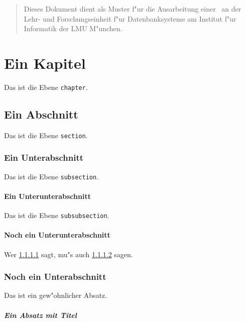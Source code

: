 \documentclass[pdftex,12pt,a4paper]{report}
\begin{document}
\deckblatt

\erklaerung

\begin{abstract}
Dieses Dokument dient als Muster f"ur die Ausarbeitung einer \the\arbeit\
an der Lehr- und Forschungseinheit f"ur Datenbanksysteme am Institut f"ur
Informatik der LMU M"unchen.
\end{abstract}

\tableofcontents

\chapter{Ein Kapitel}

Das ist die Ebene {\tt chapter}.

\section{Ein Abschnitt}

Das ist die Ebene {\tt section}.

\subsection{Ein Unterabschnitt}

Das ist die Ebene {\tt subsection}.

\subsubsection{Ein Unterunterabschnitt}
\label{sec:a}

Das ist die Ebene {\tt subsubsection}.

\subsubsection{Noch ein Unterunterabschnitt}
\label{sec:b}

Wer \ref{sec:a} sagt, mu"s auch \ref{sec:b} sagen.

\subsection{Noch ein Unterabschnitt}

Das ist ein gew"ohnlicher Absatz.

\paragraph{Ein Absatz mit Titel}
\end{document}
